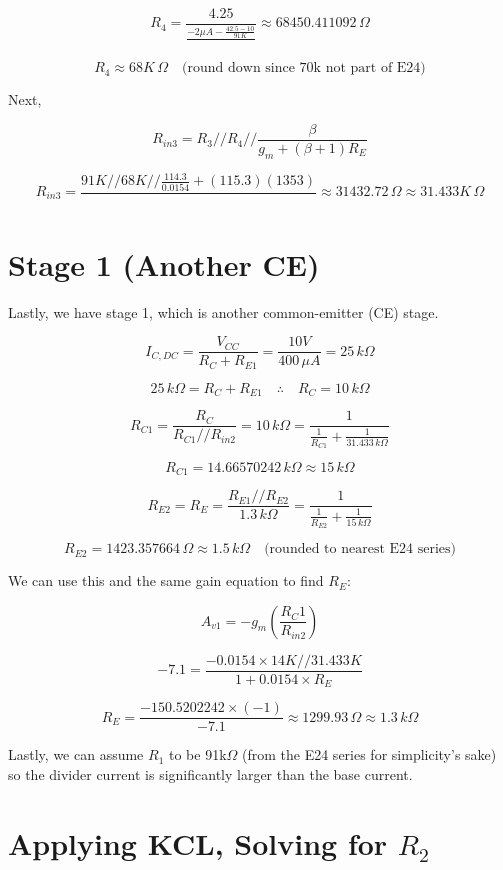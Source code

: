 \[
R_4 = \frac{4.25}{\frac{-2\mu A - \frac{42.5-10}{91K}}{}} \approx 68450.411092 \, \Omega
\]

\[
R_4 \approx 68K \, \Omega \quad \text{(round down since 70k not part of E24)}
\]

Next, 

\[
R_{in3} = R_3 // R_4 // \frac{\beta}{g_m + (\beta + 1)R_E}
\]

\[
R_{in3} = \frac{91K // 68K // \frac{114.3}{0.0154} + (115.3)(1353)}{} \approx 31432.72 \, \Omega \approx 31.433K \, \Omega
\]

\section{Stage 1 (Another CE)}

Lastly, we have stage 1, which is another common-emitter (CE) stage.

\[
I_{C,DC} = \frac{V_{CC}}{R_C + R_{E1}} = \frac{10V}{400 \, \mu A} = 25 \, k\Omega
\]

\[
25 \, k\Omega = R_C + R_{E1} \quad \therefore \quad R_C = 10 \, k\Omega
\]

\[
R_{C1} = \frac{R_C}{R_{C1} // R_{in2}} = 10 \, k\Omega = \frac{1}{\frac{1}{R_{C1}} + \frac{1}{31.433 \, k\Omega}}
\]

\[
R_{C1} = 14.66570242 \, k\Omega \approx 15 \, k\Omega
\]

\[
R_{E2} = R_E = \frac{R_{E1} // R_{E2}}{1.3 \, k\Omega} = \frac{1}{\frac{1}{R_{E2}} + \frac{1}{15 \, k\Omega}}
\]

\[
R_{E2} = 1423.357664 \, \Omega \approx 1.5 \, k\Omega \quad \text{(rounded to nearest E24 series)}
\]

We can use this and the same gain equation to find \( R_E \):

\[
A_{v1} = -g_m \left( \frac{R_C1}{R_{in2}} \right)
\]

\[
-7.1 = \frac{-0.0154 \times 14K // 31.433K}{1 + 0.0154 \times R_E}
\]

\[
R_E = \frac{-150.5202242 \times (-1)}{-7.1} \approx 1299.93 \, \Omega \approx 1.3 \, k\Omega
\]

Lastly, we can assume \( R_1 \) to be 91k\(\Omega\) (from the E24 series for simplicity's sake) so the divider current is significantly larger than the base current.

\section{Applying KCL, Solving for \(R_2\)}

